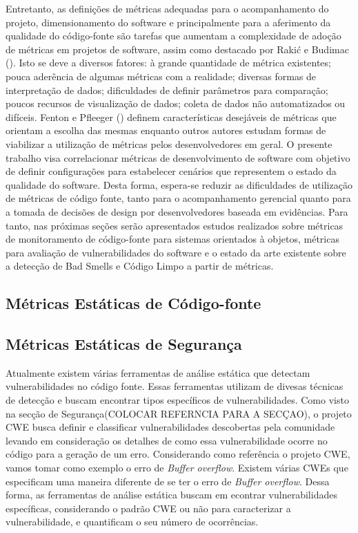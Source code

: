 Entretanto, as definições de métricas adequadas para o acompanhamento do projeto, dimensionamento do software e principalmente para a aferimento da qualidade do código-fonte são tarefas que aumentam a complexidade de adoção de métricas em projetos de software, assim como destacado por Rakić e Budimac (\citeyear{rakic2011budimac}). Isto se deve a diversos fatores: à grande quantidade de métrica existentes; pouca aderência de algumas métricas com a realidade; diversas formas de interpretação de dados; dificuldades de definir parâmetros para comparação; poucos recursos de visualização de dados; coleta de dados não automatizados ou difíceis. Fenton e Pfleeger (\citeyear{fenton1998}) definem características desejáveis de métricas que orientam a escolha das mesmas enquanto outros autores \cite{meirelles2013metrics}\cite{almeida2010} estudam formas de viabilizar a utilização de métricas pelos desenvolvedores em geral. O presente trabalho visa correlacionar métricas de desenvolvimento de software com objetivo de definir configurações para estabelecer cenários que representem o estado da qualidade do software. Desta forma, espera-se reduzir as dificuldades de utilização de métricas de código fonte, tanto para o acompanhamento gerencial quanto para a tomada de decisões de design por desenvolvedores baseada em evidências. Para tanto, nas próximas seções serão apresentados estudos realizados sobre métricas de monitoramento de código-fonte para sistemas orientados à objetos, métricas para avaliação de vulnerabilidades do software e o estado da arte existente sobre a detecção de Bad Smells e Código Limpo a partir de métricas.

%

\subsection{Métricas Estáticas de Código-fonte}

%

\subsection{Métricas Estáticas de Segurança}

Atualmente existem várias ferramentas de análise estática que detectam vulnerabilidades no código fonte. Essas ferramentas utilizam de divesas técnicas de detecção e buscam encontrar tipos específicos de vulnerabilidades. Como visto na secção de Segurança(COLOCAR REFERNCIA PARA A SECÇAO), o projeto CWE busca definir  e classificar vulnerabilidades descobertas pela comunidade levando em consideração os detalhes de como essa vulnerabilidade ocorre no código para a geração de um erro. Considerando como referência o projeto CWE, vamos tomar como exemplo o erro de \emph{Buffer overflow}. Existem várias CWEs que especificam uma maneira diferente de se ter o erro de \emph{Buffer overflow}. Dessa forma, as ferramentas de análise estática buscam em econtrar vulnerabilidades específicas, considerando o padrão CWE ou não para caracterizar a vulnerabilidade, e quantificam o seu número de ocorrências.

